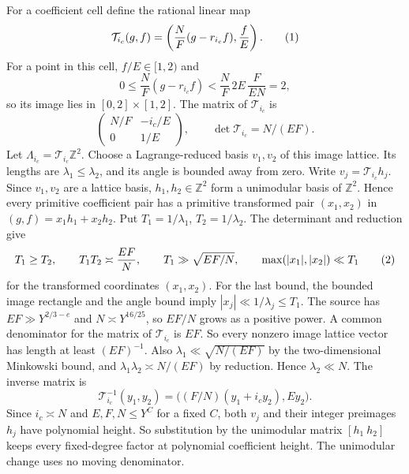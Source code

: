 For a coefficient cell define the rational linear map
\[
 \mathcal T_{i_c}(g,f)=
 \left(\frac{N}{ F}(g-r_{i_c}f),\frac{f}{ E}\right).
\AutoTag{eq:old:6_19c}
\]
For a point in this cell, $f/E\in[1,2)$ and
\[
0\le \frac{N}{ F}(g-r_{i_c}f)
 <\frac{N}{ F}\,2E\,\frac{F}{ EN}=2,
\]
so its image lies in $[0,2]\times[1,2]$.  The matrix of
$\mathcal T_{i_c}$ is
\[
\begin{pmatrix}N/F&-i_c/E\\0&1/E\end{pmatrix},\qquad
\det\mathcal T_{i_c}=N/(EF).
\]
Let $\Lambda_{i_c}=\mathcal T_{i_c}\mathbb Z^2$.  Choose a
Lagrange-reduced basis $v_1,v_2$ of this image lattice.  Its lengths are
$\lambda_1\le\lambda_2$, and its angle is bounded away from zero.  Write
$v_j=\mathcal T_{i_c}h_j$.  Since $v_1,v_2$ are a lattice basis,
$h_1,h_2\in\mathbb Z^2$ form a unimodular basis of $\mathbb Z^2$.
Hence every primitive coefficient pair has a primitive transformed
pair $(x_1,x_2)$ in $(g,f)=x_1h_1+x_2h_2$.  Put
$T_1=1/\lambda_1$, $T_2=1/\lambda_2$.  The determinant and reduction give
\[
 T_1\ge T_2,\qquad T_1T_2\asymp \frac{EF}{ N},\qquad
 T_1\gg\sqrt{EF/N},\qquad
 \max(|x_1|,|x_2|)\ll T_1
\AutoTag{eq:old:6_19d}
\]
for the transformed coordinates $(x_1,x_2)$.  For the last bound, the
bounded image rectangle and the angle bound imply
$|x_j|\ll1/\lambda_j\le T_1$.  The source has
$EF\gg Y^{2/3-e}$ and $N\asymp Y^{16/25}$, so $EF/N$ grows as a positive
power.  A common denominator for the matrix of $\mathcal T_{i_c}$ is
$EF$.  So every nonzero image lattice vector has length at least
$(EF)^{-1}$.  Also $\lambda_1\ll\sqrt{N/(EF)}$ by the two-dimensional
Minkowski bound, and $\lambda_1\lambda_2\asymp N/(EF)$ by reduction.
Hence $\lambda_2\ll N$.  The inverse matrix is
\[
\mathcal T_{i_c}^{-1}(y_1,y_2)
=\bigl((F/N)(y_1+i_cy_2),Ey_2\bigr).
\]
Since $i_c\asymp N$ and $E,F,N\le Y^C$ for a fixed $C$, both $v_j$
and their integer preimages $h_j$ have polynomial height.  So substitution
by the unimodular matrix $[h_1\ h_2]$ keeps every fixed-degree factor at
polynomial coefficient height.  The unimodular change uses no moving
denominator.

